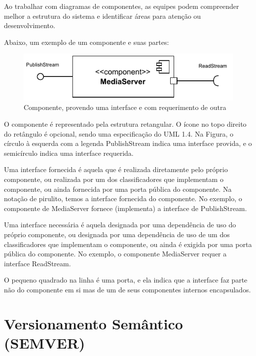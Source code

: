 \documentclass[12pt, %
openright, 
oneside, %
a4paper,    %
brazil]{facom-ufu-abntex2}
\begin{document}
Ao trabalhar com diagramas de componentes, as equipes podem compreender melhor
a estrutura do sistema e identificar áreas para atenção ou desenvolvimento.

Abaixo, um exemplo de um componente e suas partes:


\begin{figure}[!ht]
	\centering
	\includegraphics[width=0.8\linewidth]{example_diagram.pdf}
	\caption[Componente de exemplo]{Componente, provendo uma interface e com requerimento de outra}
	\label{fig:graficosVariandoTamanhoRede}
\end{figure}

O componente é representado pela estrutura retangular. O ícone no topo direito
do retângulo é opcional, sendo uma especificação do UML 1.4. Na Figura, o
círculo à esquerda com a legenda PublishStream indica uma interface provida, e
o semicírculo indica uma interface requerida.

Uma interface fornecida é aquela que é realizada diretamente pelo próprio
componente, ou realizada por um dos classificadores que implementam o
componente, ou ainda fornecida por uma porta pública do componente. Na notação
de pirulito, temos a interface fornecida do componente. No exemplo, o
componente de MediaServer fornece (implementa) a interface de PublishStream.

Uma interface necessária é aquela designada por uma dependência de uso do
próprio componente, ou designada por uma dependência de uso de um dos
classificadores que implementam o componente, ou ainda é exigida por uma porta
pública do componente. No exemplo, o componente MediaServer requer a interface
ReadStream.

O pequeno quadrado na linha é uma porta, e ela indica que a interface faz parte
não do componente em si mas de um de seus componentes internos encapsulados.

\section{Versionamento Semântico (SEMVER)}
\end{document}
